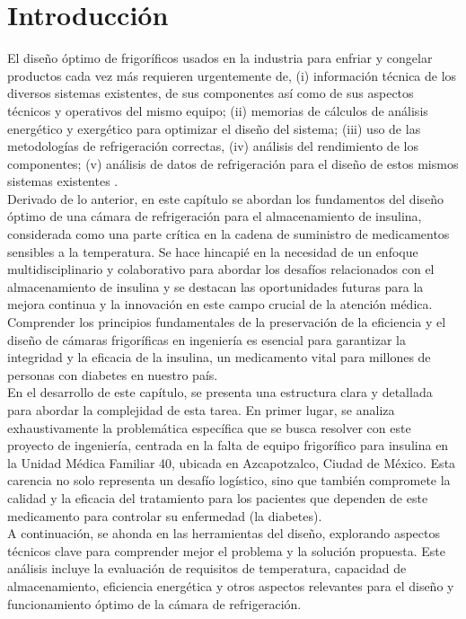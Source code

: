 \section*{Introducción}
\rsp
\setcounter{chapter}{3}
El diseño óptimo de frigoríficos usados en la industria para enfriar y congelar productos cada vez más requieren urgentemente de, (i) información técnica de los diversos sistemas existentes, de sus componentes así como de sus aspectos técnicos y operativos del mismo equipo; (ii) memorias de cálculos de análisis energético y exergético para optimizar el diseño del sistema; (iii) uso de las metodologías de refrigeración correctas, (iv) análisis del rendimiento de los componentes; (v) análisis de datos de refrigeración para el diseño de estos mismos sistemas existentes \cite{Dincer2010-re}. \\
Derivado de lo anterior, en este capítulo se abordan los fundamentos del diseño óptimo de una cámara de refrigeración para el almacenamiento de insulina, considerada como una parte crítica en la cadena de suministro de medicamentos sensibles a la temperatura. Se hace hincapié en la necesidad de un enfoque multidisciplinario y colaborativo para abordar los desafíos relacionados con el almacenamiento de insulina y se destacan las oportunidades futuras para la mejora continua y la innovación en este campo crucial de la atención médica.\\ Comprender los principios fundamentales de la preservación de la eficiencia y el diseño de cámaras frigoríficas en ingeniería es esencial para garantizar la integridad y la eficacia de la insulina, un medicamento vital para millones de personas con diabetes en nuestro país.\\
En el desarrollo de este capítulo, se presenta una estructura clara y detallada para abordar la complejidad de esta tarea. En primer lugar, se analiza exhaustivamente la problemática específica que se busca resolver con este proyecto de ingeniería, centrada en la falta de equipo frigorífico para insulina en la Unidad Médica Familiar 40, ubicada en Azcapotzalco, Ciudad de México. Esta carencia no solo representa un desafío logístico, sino que también compromete la calidad y la eficacia del tratamiento para los pacientes que dependen de este medicamento para controlar su enfermedad (la diabetes).\\
A continuación, se ahonda en las herramientas del diseño, explorando aspectos técnicos clave para comprender mejor el problema y la solución propuesta. Este análisis incluye la evaluación de requisitos de temperatura, capacidad de almacenamiento, eficiencia energética y otros aspectos relevantes para el diseño y funcionamiento óptimo de la cámara de refrigeración.\\
